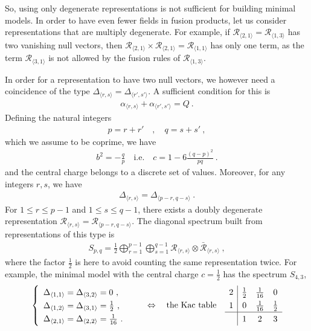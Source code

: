 \documentclass[12pt, a4paper]{article}
\theoremstyle{break}
\begin{document}
So, using only degenerate representations is not sufficient for building minimal models.
In order to have even fewer fields in fusion products, let us consider representations that are multiply degenerate. For example, if $\mathcal{R}_{\langle 2, 1\rangle} = \mathcal{R}_{\langle 1, 3\rangle}$ has two vanishing null vectors, then $\mathcal{R}_{\langle 2, 1\rangle} \times \mathcal{R}_{\langle 2, 1\rangle} = \mathcal{R}_{\langle 1,1\rangle}$ has only one term, as the term $\mathcal{R}_{\langle 3, 1\rangle}$ is not allowed by the fusion rules of $\mathcal{R}_{\langle 1, 3\rangle}$.

In order for a representation to have two null vectors, we however need a coincidence of the type $\Delta_{\langle r,s \rangle} = \Delta_{\langle r',s' \rangle}$. A sufficient condition for this is 
\begin{align}
 \alpha_{\langle r,s \rangle} + \alpha_{\langle r',s' \rangle} = Q\ .
\end{align}
Defining the natural integers 
\begin{align}
 p = r+r' \quad , \quad q = s+s'\ ,
\end{align}
which we assume to be coprime, we have 
\begin{align} 
 b^2 = - \frac{q}{p} \quad \text{i.e.} \quad c = 1-6\frac{(q-p)^2}{pq}\ .
\end{align}
and the central charge belongs to a discrete set of values. 
Moreover, for any integers $r,s$, we have 
\begin{align}
 \Delta_{\langle r,s \rangle} = \Delta_{\langle p-r, q-s\rangle}\ .
\end{align}
For $1\leq r\leq p-1$ and $1\leq s\leq q-1$, there exists a doubly degenerate representation $\mathcal{R}_{\langle r, s\rangle} = \mathcal{R}_{\langle p-r, q-s\rangle}$. The diagonal spectrum built from representations of this type is 
\begin{align}
 S_{p, q} = \frac12 \bigoplus_{r=1}^{p-1} \bigoplus_{s=1}^{q-1} \mathcal{R}_{\langle r,s \rangle}\otimes \mathcal{\bar{R}}_{\langle r,s \rangle}\ ,
\end{align}
where the factor $\frac12$ is here to avoid counting the same representation twice. For example, the minimal model with the central charge $c=\frac12$ has the spectrum $S_{4,3}$, 
\begin{align}
\renewcommand{\arraystretch}{1.3}
 \left\{\begin{array}{l} \Delta_{\langle 1,1\rangle}=\Delta_{\langle 3,2\rangle} = 0 \ , \\ \Delta_{\langle 1,2\rangle} =\Delta_{\langle 3,1\rangle} = \frac12 \ , \\ \Delta_{\langle 2,1\rangle} =\Delta_{\langle 2,2\rangle} = \frac{1}{16} \ .\end{array}\right. 
 \qquad \Leftrightarrow \quad \text{the Kac table} \quad 
 \begin{array}{c|ccc} 2 & \frac{1}{2} & \frac{1}{16} & 0 \\ 1 & 0 & \frac{1}{16} & \frac{1}{2} \\  \hline & 1 & 2 & 3 \end{array} 
\end{align}
\end{document}
